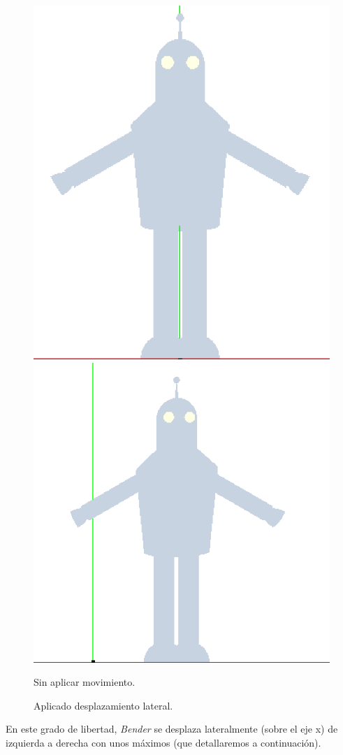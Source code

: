 \documentclass{article}
\begin{document}
	\begin{figure}[h]
		\includegraphics[width=0.4\linewidth]{cabeza1}
		\includegraphics[width=0.47\linewidth]{desplazamientolateral}
		\caption{Sin aplicar movimiento.}
		\caption{Aplicado desplazamiento lateral.}
		\label{fig:desplazamientolateral}
	\end{figure}

	En este grado de libertad, \textit{Bender} se desplaza lateralmente (sobre el eje x) de izquierda a derecha con unos máximos (que detallaremos a continuación).
	
\end{document}
